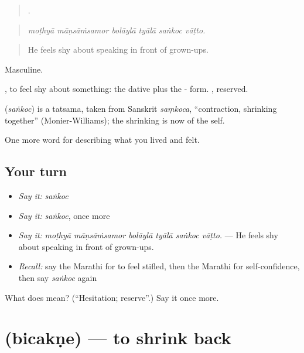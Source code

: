 \begin{quote}
     .
\end{quote}

\begin{quote}
\emph{moṭhyā māṇsāṁsamor bolāylā tyālā saṅkoc vāṭto.}
\end{quote}

\begin{quote}
He feels shy about speaking in front of grown-ups.
\end{quote}

Masculine.

 , to feel shy about something: the dative plus the - form. , reserved.

\begin{cousinweb}
\textbf{} (\emph{saṅkoc}) is a tatsama, taken from Sanskrit \emph{saṃkoca}, \textquotedblleft{}contraction, shrinking together\textquotedblright{} (Monier-Williams); the shrinking is now of the self.
\end{cousinweb}

\begin{grammarlens}[title={What you've built}]
One more word for describing what you lived and felt.
\end{grammarlens}

\subsection*{Your turn}
\begin{itemize}
\raggedright
  \item \emph{Say it:} \emph{saṅkoc}
  \item \emph{Say it:} \emph{saṅkoc}, once more
  \item \emph{Say it:} \emph{moṭhyā māṇsāṁsamor bolāylā tyālā saṅkoc vāṭto.} — He feels shy about speaking in front of grown-ups.
  \item \emph{Recall:} say the Marathi for to feel stifled, then the Marathi for self-confidence, then say \emph{saṅkoc} again
\end{itemize}

\begin{tcolorbox}[breakable,colback=teal!4,colframe=teal!35!black,title={Before you move on}]
What does  mean? (\textquotedblleft{}Hesitation; reserve\textquotedblright{}.) Say it once more.
\end{tcolorbox}
\section[\texorpdfstring{\mr{बिचकणे} (bicakṇe)}{बिचकणे (bicakṇe)}]{ (bicakṇe) — to shrink back}

